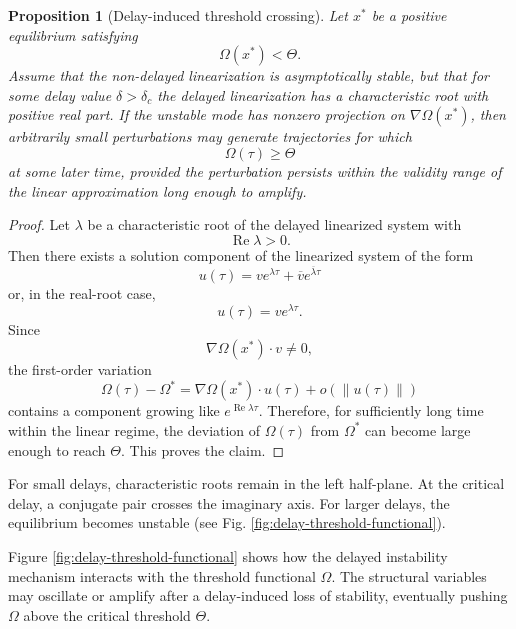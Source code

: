 \documentclass[11pt]{article}
\newtheorem{proposition}{Proposition}
\begin{document}
\begin{proposition}[Delay-induced threshold crossing]
	\label{prop:delay-threshold-crossing}
	Let $x^\ast$ be a positive equilibrium satisfying
	\[
	\Omega(x^\ast)<\Theta.
	\]
	Assume that the non-delayed linearization is asymptotically stable, but that for some delay value $\delta>\delta_c$ the delayed linearization has a characteristic root with positive real part. If the unstable mode has nonzero projection on $\nabla\Omega(x^\ast)$, then arbitrarily small perturbations may generate trajectories for which
	\[
	\Omega(\tau)\geq\Theta
	\]
	at some later time, provided the perturbation persists within the validity range of the linear approximation long enough to amplify.
\end{proposition}

\begin{proof}
	Let $\lambda$ be a characteristic root of the delayed linearized system with
	\[
	\operatorname{Re}\lambda>0.
	\]
	Then there exists a solution component of the linearized system of the form
	\[
	u(\tau)=ve^{\lambda\tau}+\overline{v}e^{\overline{\lambda}\tau}
	\]
	or, in the real-root case,
	\[
	u(\tau)=ve^{\lambda\tau}.
	\]
	Since
	\[
	\nabla\Omega(x^\ast)\cdot v\neq 0,
	\]
	the first-order variation
	\[
	\Omega(\tau)-\Omega^\ast
	=
	\nabla\Omega(x^\ast)\cdot u(\tau)
	+
	o(\|u(\tau)\|)
	\]
	contains a component growing like $e^{\operatorname{Re}\lambda \tau}$. Therefore, for sufficiently long time within the linear regime, the deviation of $\Omega(\tau)$ from $\Omega^\ast$ can become large enough to reach $\Theta$. This proves the claim.
\end{proof}

 For small delays, characteristic roots remain in the left half-plane. At the critical delay, a conjugate pair crosses the imaginary axis. For larger delays, the equilibrium becomes unstable (see Fig. \ref{fig:delay-threshold-functional}).



Figure \ref{fig:delay-threshold-functional} shows how the delayed instability mechanism interacts with the threshold functional $\Omega$. The structural variables may oscillate or amplify after a delay-induced loss of stability, eventually pushing $\Omega$ above the critical threshold $\Theta$.
\end{document}
